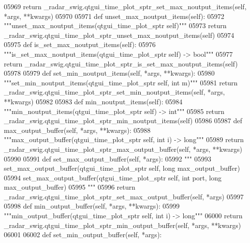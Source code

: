 \begin{DoxyCode}
{{{{{{{{{{{{{{{{{{{{05969         \textcolor{keywordflow}{return} \_radar\_swig.qtgui\_time\_plot\_sptr\_set\_max\_noutput\_items(self, *args, **kwargs)
05970 
05971     \textcolor{keyword}{def }unset_max_noutput_items(self):
05972         \textcolor{stringliteral}{"""unset\_max\_noutput\_items(qtgui\_time\_plot\_sptr self)"""}
05973         \textcolor{keywordflow}{return} \_radar\_swig.qtgui\_time\_plot\_sptr\_unset\_max\_noutput\_items(self)
05974 
05975     \textcolor{keyword}{def }is_set_max_noutput_items(self):
05976         \textcolor{stringliteral}{"""is\_set\_max\_noutput\_items(qtgui\_time\_plot\_sptr self) -> bool"""}
05977         \textcolor{keywordflow}{return} \_radar\_swig.qtgui\_time\_plot\_sptr\_is\_set\_max\_noutput\_items(self)
05978 
05979     \textcolor{keyword}{def }set_min_noutput_items(self, *args, **kwargs):
05980         \textcolor{stringliteral}{"""set\_min\_noutput\_items(qtgui\_time\_plot\_sptr self, int m)"""}
05981         \textcolor{keywordflow}{return} \_radar\_swig.qtgui\_time\_plot\_sptr\_set\_min\_noutput\_items(self, *args, **kwargs)
05982 
05983     \textcolor{keyword}{def }min_noutput_items(self):
05984         \textcolor{stringliteral}{"""min\_noutput\_items(qtgui\_time\_plot\_sptr self) -> int"""}
05985         \textcolor{keywordflow}{return} \_radar\_swig.qtgui\_time\_plot\_sptr\_min\_noutput\_items(self)
05986 
05987     \textcolor{keyword}{def }max_output_buffer(self, *args, **kwargs):
05988         \textcolor{stringliteral}{"""max\_output\_buffer(qtgui\_time\_plot\_sptr self, int i) -> long"""}
05989         \textcolor{keywordflow}{return} \_radar\_swig.qtgui\_time\_plot\_sptr\_max\_output\_buffer(self, *args, **kwargs)
05990 
05991     \textcolor{keyword}{def }set_max_output_buffer(self, *args):
05992         \textcolor{stringliteral}{"""}
05993 \textcolor{stringliteral}{        set\_max\_output\_buffer(qtgui\_time\_plot\_sptr self, long max\_output\_buffer)}
05994 \textcolor{stringliteral}{        set\_max\_output\_buffer(qtgui\_time\_plot\_sptr self, int port, long max\_output\_buffer)}
05995 \textcolor{stringliteral}{        """}
05996         \textcolor{keywordflow}{return} \_radar\_swig.qtgui\_time\_plot\_sptr\_set\_max\_output\_buffer(self, *args)
05997 
05998     \textcolor{keyword}{def }min_output_buffer(self, *args, **kwargs):
05999         \textcolor{stringliteral}{"""min\_output\_buffer(qtgui\_time\_plot\_sptr self, int i) -> long"""}
06000         \textcolor{keywordflow}{return} \_radar\_swig.qtgui\_time\_plot\_sptr\_min\_output\_buffer(self, *args, **kwargs)
06001 
06002     \textcolor{keyword}{def }set_min_output_buffer(self, *args):
}}}}}}}}}}}}}}}}}}}}
\end{DoxyCode}
